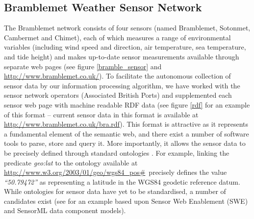 \documentclass{acmtrans2m}
\begin{document}
\subsection{Bramblemet Weather Sensor Network}

\noindent The Bramblemet network consists of four sensors (named Bramblemet, Sotonmet, Cambermet and Chimet), each of which measures a range of environmental variables (including wind speed and direction, air temperature, sea temperature, and tide height) and makes up-to-date sensor measurements available through separate web pages (see figure \ref{bramble_sensor} and \small\url{http://www.bramblemet.co.uk/}\normalsize). To facilitate the autonomous collection of sensor data by our information processing algorithm, we have worked with the sensor network operators (Associated British Ports) and supplemented each sensor web page with machine readable RDF data (see figure \ref{rdf} for an example of this format -- current sensor data in this format is available at \small\url{http://www.bramblemet.co.uk/bra.rdf}\normalsize). This format is attractive as it represents a fundamental element of the semantic web, and there exist a number of software tools to parse, store and query it. More importantly, it allows the sensor data to be precisely defined through standard ontologies \cite{rdf}. For example, linking the predicate {\em geo:lat} to the ontology available at \small\url{http://www.w3.org/2003/01/geo/wgs84_pos#}\normalsize ~precisely defines the value {\em ``50.79472''} as representing a latitude in the WGS84 geodetic reference datum. While ontologies for sensor data have yet to be standardised, a number of candidates exist (see \cite{sensor_rdf} for an example based upon Sensor Web Enablement (SWE) and SensorML data component models).
\end{document}
